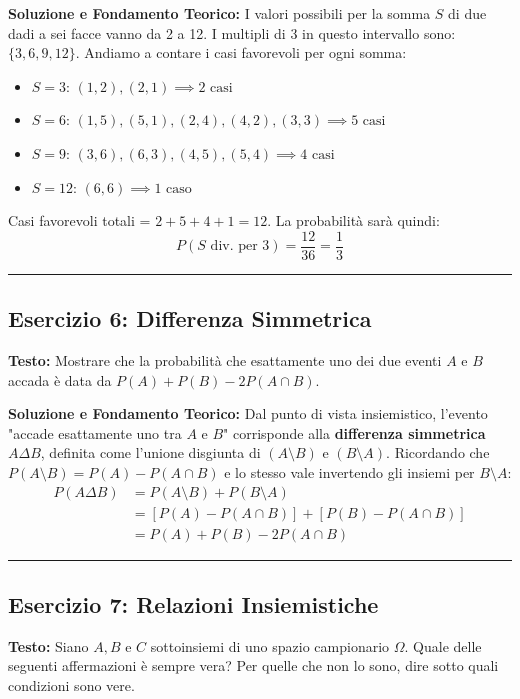 \documentclass[12pt, a4paper]{article}
\begin{document}
\textbf{Soluzione e Fondamento Teorico:} 
I valori possibili per la somma $S$ di due dadi a sei facce vanno da 2 a 12. I multipli di 3 in questo intervallo sono: $\{3, 6, 9, 12\}$.
Andiamo a contare i casi favorevoli per ogni somma:
\begin{itemize}
    \item $S=3$: $(1,2), (2,1) \implies 2 \text{ casi}$
    \item $S=6$: $(1,5), (5,1), (2,4), (4,2), (3,3) \implies 5 \text{ casi}$
    \item $S=9$: $(3,6), (6,3), (4,5), (5,4) \implies 4 \text{ casi}$
    \item $S=12$: $(6,6) \implies 1 \text{ caso}$
\end{itemize}
Casi favorevoli totali = $2 + 5 + 4 + 1 = 12$. La probabilità sarà quindi:
$$ P(S \text{ div. per 3}) = \frac{12}{36} = \frac{1}{3} $$

\vspace{0.5cm}\hrule\vspace{0.5cm}

\subsection*{Esercizio 6: Differenza Simmetrica}
\textbf{Testo:} Mostrare che la probabilità che esattamente uno dei due eventi $A$ e $B$ accada è data da $P(A)+P(B)-2P(A \cap B)$.

\textbf{Soluzione e Fondamento Teorico:} 
Dal punto di vista insiemistico, l'evento "accade esattamente uno tra $A$ e $B$" corrisponde alla \textbf{differenza simmetrica} $A \Delta B$, definita come l'unione disgiunta di $(A \setminus B)$ e $(B \setminus A)$.
Ricordando che $P(A \setminus B) = P(A) - P(A \cap B)$ e lo stesso vale invertendo gli insiemi per $B \setminus A$:
\begin{align*}
P(A \Delta B) &= P(A \setminus B) + P(B \setminus A) \\
&= [P(A) - P(A \cap B)] + [P(B) - P(A \cap B)] \\
&= P(A) + P(B) - 2P(A \cap B)
\end{align*}

\vspace{0.5cm}\hrule\vspace{0.5cm}

\subsection*{Esercizio 7: Relazioni Insiemistiche}
\textbf{Testo:} Siano $A, B$ e $C$ sottoinsiemi di uno spazio campionario $\Omega$. Quale delle seguenti affermazioni è sempre vera? Per quelle che non lo sono, dire sotto quali condizioni sono vere.
\end{document}
